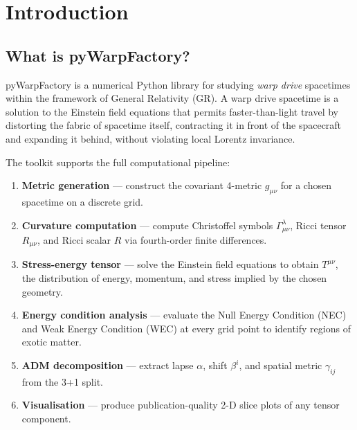 \documentclass[11pt, a4paper, twoside]{report}
\begin{document}
\cleardoublepage

\tableofcontents
\cleardoublepage

\chapter{Introduction}

\section{What is pyWarpFactory?}

pyWarpFactory is a numerical Python library for studying \emph{warp drive}
spacetimes within the framework of General Relativity (GR).  A warp drive
spacetime is a solution to the Einstein field equations that permits
faster-than-light travel by distorting the fabric of spacetime itself,
contracting it in front of the spacecraft and expanding it behind, without
violating local Lorentz invariance.

The toolkit supports the full computational pipeline:
\begin{enumerate}
  \item \textbf{Metric generation} — construct the covariant 4-metric
        $g_{\mu\nu}$ for a chosen spacetime on a discrete grid.
  \item \textbf{Curvature computation} — compute Christoffel symbols
        $\varGamma^\lambda_{\mu\nu}$, Ricci tensor $R_{\mu\nu}$, and
        Ricci scalar $R$ via fourth-order finite differences.
  \item \textbf{Stress-energy tensor} — solve the Einstein field equations
        to obtain $T^{\mu\nu}$, the distribution of energy, momentum, and
        stress implied by the chosen geometry.
  \item \textbf{Energy condition analysis} — evaluate the Null Energy
        Condition (NEC) and Weak Energy Condition (WEC) at every grid
        point to identify regions of exotic matter.
  \item \textbf{ADM decomposition} — extract lapse $\alpha$, shift
        $\beta^i$, and spatial metric $\gamma_{ij}$ from the 3+1 split.
  \item \textbf{Visualisation} — produce publication-quality 2-D slice
        plots of any tensor component.
\end{enumerate}
\end{document}
